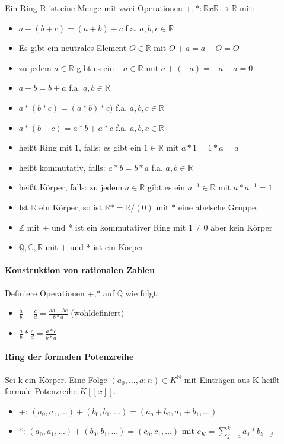 \documentclass[10pt,landscape]{article}
\begin{document}
\begin{multicols}{3}
Ein Ring R ist eine Menge mit zwei Operationen $+,*: \mathbb{R} x \mathbb{R} \rightarrow \mathbb{R}$ mit:
\begin{itemize}
    \item $a+(b+c) = (a+b)+c$ f.a. $a,b,c\in \mathbb{R}$
    \item Es gibt ein neutrales Element $O\in \mathbb{R}$ mit $O+a=a+O=O$
    \item zu jedem $a\in \mathbb{R}$ gibt es ein $-a\in \mathbb{R}$ mit $a+(-a)=-a+a=0$
    \item $a+b=b+a$ f.a. $a,b\in\mathbb{R}$
    \item $a*(b*c)=(a*b)*c)$ f.a. $a,b,c\in\mathbb{R}$
    \item $a*(b+c)=a*b+a*c$ f.a. $a,b,c\in\mathbb{R}$
    \item heißt Ring mit 1, falls: es gibt ein $1\in\mathbb{R}$ mit $a*1=1*a=a$
    \item heißt kommutativ, falls: $a*b=b*a$ f.a. $a,b\in\mathbb{R}$
    \item heißt Körper, falls: zu jedem $a\in\mathbb{R}$ gibt es ein $a^{-1}\in\mathbb{R}$ mit $a*a^{-1}=1$
    \item Ist $\mathbb{R}$ ein Körper, so ist $\mathbb{R}*=\mathbb{R} /(0)$ mit $*$ eine abelsche Gruppe.
    \item $\mathbb{Z}$ mit + und * ist ein kommutativer Ring mit $1 \not= 0$ aber kein Körper
    \item $\mathbb{Q}, \mathbb{C}, \mathbb{R}$ mit + und * ist ein Körper
\end{itemize}

\paragraph{Konstruktion von rationalen Zahlen}
Definiere Operationen +,* auf $\mathbb{Q}$ wie folgt:
\begin{itemize}
    \item $\frac{a}{b}+\frac{c}{d} = \frac{ad+bc}{b*d}$ (wohldefiniert)
    \item $\frac{a}{b}*\frac{c}{d} = \frac{a*c}{b*d}$
\end{itemize}

\paragraph{Ring der formalen Potenzreihe}
Sei k ein Körper. Eine Folge $(a_0,...,a:n)\in K^{\mathbb{N}}$ mit Einträgen aus K heißt formale Potenzreihe $K[[x]]$.
\begin{itemize}
    \item +: $(a_0,a_1,...) + (b_0,b_1,...) = (a_o+b_0, a_1+b_1, ...)$
    \item *: $(a_0,a_1,...) + (b_0,b_1,...) = (c_0, c_1,...)$ mit $c_K=\sum_{j=a}^{k} a_j*b_{k-j}$
\end{itemize}


\end{multicols}
\end{document}
